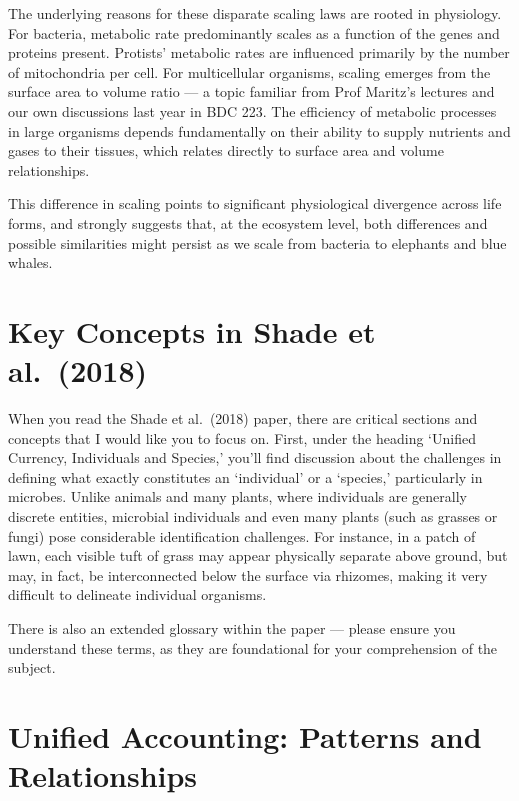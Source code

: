 \documentclass[
  11pt,
]{book}
\begin{document}
The underlying reasons for these disparate scaling laws are rooted in
physiology. For bacteria, metabolic rate predominantly scales as a
function of the genes and proteins present. Protists' metabolic rates
are influenced primarily by the number of mitochondria per cell. For
multicellular organisms, scaling emerges from the surface area to volume
ratio --- a topic familiar from Prof Maritz's lectures and our own
discussions last year in BDC 223. The efficiency of metabolic processes
in large organisms depends fundamentally on their ability to supply
nutrients and gases to their tissues, which relates directly to surface
area and volume relationships.

This difference in scaling points to significant physiological
divergence across life forms, and strongly suggests that, at the
ecosystem level, both differences and possible similarities might
persist as we scale from bacteria to elephants and blue whales.

\section{Key Concepts in Shade et
al.~(2018)}\label{key-concepts-in-shade-et-al.-2018}

When you read the Shade et al.~(2018) paper, there are critical sections
and concepts that I would like you to focus on. First, under the heading
`Unified Currency, Individuals and Species,' you'll find discussion
about the challenges in defining what exactly constitutes an
`individual' or a `species,' particularly in microbes. Unlike animals
and many plants, where individuals are generally discrete entities,
microbial individuals and even many plants (such as grasses or fungi)
pose considerable identification challenges. For instance, in a patch of
lawn, each visible tuft of grass may appear physically separate above
ground, but may, in fact, be interconnected below the surface via
rhizomes, making it very difficult to delineate individual organisms.

There is also an extended glossary within the paper --- please ensure
you understand these terms, as they are foundational for your
comprehension of the subject.

\section{Unified Accounting: Patterns and
Relationships}\label{unified-accounting-patterns-and-relationships}
\end{document}
